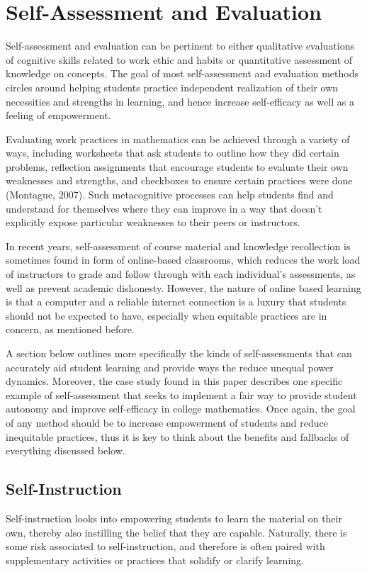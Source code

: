 \section{Self-Assessment and Evaluation}
Self-assessment and evaluation can be pertinent to either qualitative evaluations of cognitive skills related to work ethic and habits or quantitative assessment of knowledge on concepts.
The goal of most self-assessment and evaluation methods circles around helping students practice independent realization of their own necessities and strengths in learning, and hence increase self-efficacy as well as a feeling of empowerment.

Evaluating work practices in mathematics can be achieved through a variety of ways, including worksheets that ask students to outline how they did certain problems, reflection assignments that encourage students to evaluate their own weaknesses and strengths, and checkboxes to ensure certain practices were done (Montague, 2007). Such metacognitive processes can help students find and understand for themselves where they can improve in a way that doesn't explicitly expose particular weaknesses to their peers or instructors.

In recent years, self-assessment of course material and knowledge recollection is sometimes found in form of online-based classrooms, which reduces the work load of instructors to grade and follow through with each individual's assessments, as well as prevent academic dishonesty. However, the nature of online based learning is that a computer and a reliable internet connection is a luxury that students should not be expected to have, especially when equitable practices are in concern, as mentioned before.

A section below outlines more specifically the kinds of self-assessments that can accurately aid student learning and provide ways the reduce unequal power dynamics. Moreover, the case study found in this paper describes one specific example of self-assessment that seeks to implement a fair way to provide student autonomy and improve self-efficacy in college mathematics. Once again, the goal of any method should be to increase empowerment of students and reduce inequitable practices, thus it is key to think about the benefits and fallbacks of everything discussed below.

\subsection{Self-Instruction}
Self-instruction looks into empowering students to learn the material on their own, thereby also instilling the belief that they are capable. Naturally, there is some risk associated to self-instruction, and therefore is often paired with supplementary activities or practices that solidify or clarify learning.

